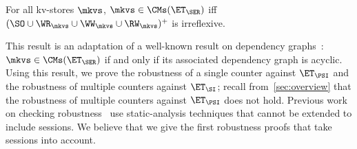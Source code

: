 \begin{theorem}
\label{thm:serialisable_nocycle}
For all kv-stores $\mkvs$, $\mkvs \in \CMs(\ET_{\SER})$ iff $(\SO \cup \WR_{\mkvs} 
\cup \WW_{\mkvs} \cup \RW_{\mkvs})^{+}$ is irreflexive.
\end{theorem}
This result is an adaptation of a well-known result on
dependency graphs~\cite{adya}: $\mkvs \in \CMs(\ET_{\SER})$ if and
only if its associated dependency graph is acyclic. 
Using this result, we prove the robustness of a single counter against $\ET_{\PSI}$ and
the robustness of  multiple counters against $\ET_{\SI}$; recall
from~\cref{sec:overview} that the robustness
of multiple counters against $\ET_{\PSI}$ does not hold.  Previous
work on checking
robustness~\cite{giovanni_concur16,SIanalysis,laws,sureshConcur} use
static-analysis techniques that cannot be extended to include
sessions.  
We believe that we give the first robustness proofs
that take sessions into account.


